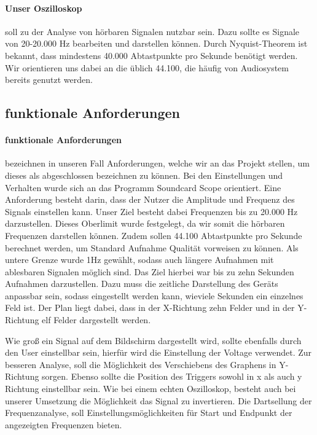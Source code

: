 \documentclass{article}
\begin{document}
\paragraph{Unser Oszilloskop}
soll zu der Analyse von hörbaren Signalen nutzbar sein. Dazu sollte es Signale von 20-20.000 Hz bearbeiten und darstellen können. Durch Nyquist-Theorem ist bekannt, dass mindestens 40.000 Abtastpunkte pro Sekunde benötigt werden. Wir orientieren uns dabei an die üblich 44.100, die häufig von Audiosystem bereits genutzt werden.

\subsection{funktionale Anforderungen}
\paragraph{funktionale Anforderungen}
bezeichnen in unseren Fall Anforderungen, welche wir an das Projekt stellen, um dieses als abgeschlossen bezeichnen zu können. Bei den Einstellungen und Verhalten wurde sich an das Programm Soundcard Scope \cite{soundcard} orientiert. Eine Anforderung besteht darin, dass der Nutzer die Amplitude und Frequenz des Signals einstellen kann. Unser Ziel besteht dabei Frequenzen bis zu 20.000 Hz darzustellen. Dieses Oberlimit wurde festgelegt, da wir somit die hörbaren Frequenzen darstellen können. Zudem sollen 44.100 Abtastpunkte pro Sekunde berechnet werden, um Standard Aufnahme Qualität vorweisen zu können. Als untere Grenze wurde 1Hz gewählt, sodass auch längere Aufnahmen mit ablesbaren Signalen möglich sind. Das Ziel hierbei war bis zu zehn Sekunden Aufnahmen darzustellen. Dazu muss die zeitliche Darstellung des Geräts anpassbar sein, sodass eingestellt werden kann, wieviele Sekunden ein einzelnes Feld ist. Der Plan liegt dabei, dass in der X-Richtung zehn Felder und in der Y-Richtung elf Felder dargestellt werden.

Wie groß ein Signal auf dem Bildschirm dargestellt wird, sollte ebenfalls durch den User einstellbar sein, hierfür wird die Einstellung der Voltage verwendet. Zur besseren Analyse, soll die Möglichkeit des Verschiebens des Graphens in Y-Richtung sorgen. Ebenso sollte die Position des Triggers sowohl in x als auch y Richtung einstellbar sein. Wie bei einem echten Oszilloskop, besteht auch bei unserer Umsetzung die Möglichkeit das Signal zu invertieren. Die Dartsellung der Frequenzanalyse, soll Einstellungsmöglichkeiten für Start und Endpunkt der angezeigten Frequenzen bieten.
\end{document}
